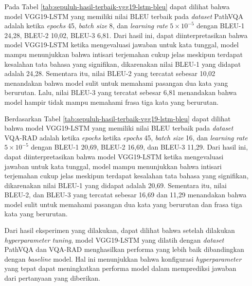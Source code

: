 \par Pada Tabel \ref{tab:sepuluh-hasil-terbaik-vgg19-lstm-bleu} dapat dilihat bahwa model VGG19-LSTM yang memiliki nilai BLEU terbaik pada \textit{dataset} PathVQA adalah ketika \textit{epochs} 45, \textit{batch size} 8, dan \textit{learning rate} $5 \times 10^{-5}$ dengan BLEU-1 24,28, BLEU-2 10,02, BLEU-3 6,81. Dari hasil ini, dapat diinterpretasikan bahwa model VGG19-LSTM ketika mengevaluasi jawaban untuk kata tunggal, model mampu menunjukkan bahwa intisari terjemahan cukup jelas meskipun terdapat kesalahan tata bahasa yang signifikan, dikarenakan nilai BLEU-1 yang didapat adalah 24,28. Sementara itu, nilai BLEU-2 yang tercatat sebesar 10,02 menandakan bahwa model sulit untuk memahami pasangan dua kata yang berurutan. Lalu, nilai BLEU-3 yang tercatat sebesar 6,81 menandakan bahwa model hampir tidak mampu memahami frasa tiga kata yang berurutan. 

\par Berdasarkan Tabel \ref{tab:sepuluh-hasil-terbaik-vgg19-lstm-bleu} dapat dilihat bahwa model VGG19-LSTM yang memiliki nilai BLEU terbaik pada \textit{dataset} VQA-RAD adalah ketika \textit{epochs} ketika \textit{epochs} 45, \textit{batch size} 16, dan \textit{learning rate} $5 \times 10^{-5}$ dengan BLEU-1 20,69, BLEU-2 16,69, dan BLEU-3 11,29. Dari hasil ini, dapat diinterpretasikan bahwa model VGG19-LSTM ketika mengevaluasi jawaban untuk kata tunggal, model mampu menunjukkan bahwa intisari terjemahan cukup jelas meskipun terdapat kesalahan tata bahasa yang signifikan, dikarenakan nilai BLEU-1 yang didapat adalah 20,69. Sementara itu, nilai BLEU-2, dan BLEU-3 yang tercatat sebesar 16,69 dan 11,29 menandakan bahwa model sulit untuk memahami pasangan dua kata yang berurutan dan frasa tiga kata yang berurutan.  

\par Dari hasil eksperimen yang dilakukan, dapat dilihat bahwa setelah dilakukan \textit{hyperparameter tuning}, model VGG19-LSTM yang dilatih dengan \textit{dataset} PathVQA dan VQA-RAD menghasilkan performa yang lebih baik dibandingkan dengan \textit{baseline} model. Hal ini menunjukkan bahwa konfigurasi \textit{hyperparameter} yang tepat dapat meningkatkan performa model dalam memprediksi jawaban dari pertanyaan yang diberikan.

